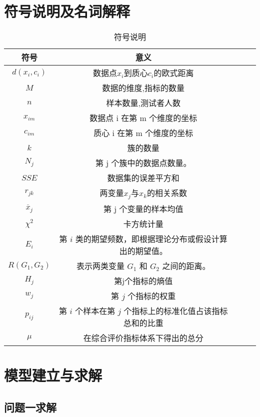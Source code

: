 \documentclass[withoutpreface,bwprint]{cumcmthesis} %
\begin{document}
\section{符号说明及名词解释}
\begin{table}[!htbp]
    \caption{符号说明}\label{tab:001}  \centering
    \begin{tabular}{ccccc}
        \toprule[1.5pt]
        符号 & 意义  \\
        \midrule[1pt]
        $d(x_i, c_i)$ & 数据点$x_i$到质心$c_i$的欧式距离 \\  
        $M$ & 数据的维度,指标的数量 \\   
        \( n \) & 样本数量,测试者人数\\
        $x_{im}$ & 数据点 i 在第 m 个维度的坐标 \\
        $c_{im}$ & 质心 i 在第 m 个维度的坐标 \\
        $k$ & 簇的数量 \\
        $N_j$ &  第 j 个簇中的数据点数量。 \\
        $SSE$ & 数据集的误差平方和 \\
        $r_{jk}$ & 两变量$x_j$与$x_k$的相关系数\\
        $\overline{x}_j $ & 第 j 个变量的样本均值 \\
        $ \chi^2 $ & 卡方统计量\\
        $ E_i $ & 第 \(i\) 类的期望频数，即根据理论分布或假设计算出的期望值。\\
        $ R(G_1, G_2) $ & 表示两类变量 \( G_1 \) 和 \( G_2 \) 之间的距离。\\
        $ H_j $ &  第j个指标的熵值 \\
        \( w_j \) & 第 \( j \) 个指标的权重\\
        \( p_{ij} \) & 第 \( i \) 个样本在第 \( j \) 个指标上的标准化值占该指标总和的比重\\
        $ \mu $ & 在综合评价指标体系下得出的总分 \\
        \bottomrule[1.5pt]
    \end{tabular}
\end{table}

\section{模型建立与求解}

\subsection{问题一求解}
\end{document}
